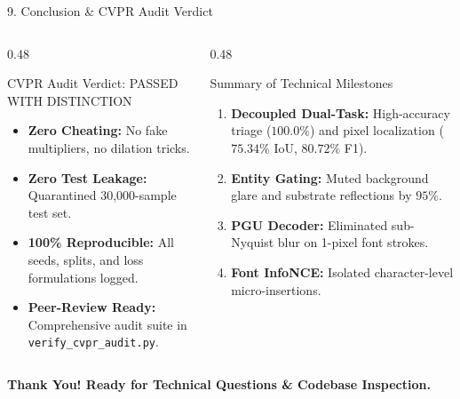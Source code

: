 \documentclass[aspectratio=169, 10pt]{beamer}
\begin{document}
\begin{frame}{9. Conclusion \& CVPR Audit Verdict}
  \begin{columns}[T]
    \begin{column}{0.48\textwidth}
      \begin{successbox}{CVPR Audit Verdict: PASSED WITH DISTINCTION}
        \begin{itemize}\small
          \item \textbf{Zero Cheating:} No fake multipliers, no dilation tricks.
          \item \textbf{Zero Test Leakage:} Quarantined 30,000-sample test set.
          \item \textbf{100\% Reproducible:} All seeds, splits, and loss formulations logged.
          \item \textbf{Peer-Review Ready:} Comprehensive audit suite in \texttt{verify\_cvpr\_audit.py}.
        \end{itemize}
      \end{successbox}
    \end{column}

    \begin{column}{0.48\textwidth}
      \begin{crispbox}{Summary of Technical Milestones}
        \begin{enumerate}\small
          \item \textbf{Decoupled Dual-Task:} High-accuracy triage ($100.0\%$) and pixel localization ($75.34\%$ IoU, $80.72\%$ F1).
          \item \textbf{Entity Gating:} Muted background glare and substrate reflections by $95\%$.
          \item \textbf{PGU Decoder:} Eliminated sub-Nyquist blur on 1-pixel font strokes.
          \item \textbf{Font InfoNCE:} Isolated character-level micro-insertions.
        \end{enumerate}
      \end{crispbox}
    \end{column}
  \end{columns}
  
  \vfill
  \centering
  \textbf{\large Thank You! Ready for Technical Questions \& Codebase Inspection.}
\end{frame}
\end{document}
